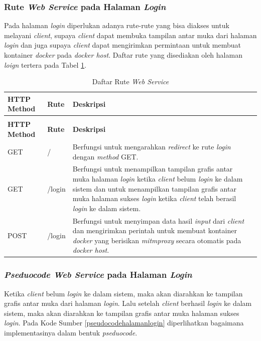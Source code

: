   \subsubsection{Rute \textit{Web Service} pada Halaman \textit{Login}}
  Pada halaman \textit{login} diperlukan adanya rute-rute yang bisa diakses untuk melayani \textit{client}, supaya \textit{client} dapat membuka tampilan antar muka dari halaman \textit{login} dan juga supaya \textit{client} dapat mengirimkan permintaan untuk membuat kontainer \textit{docker} pada \textit{docker host}. Daftar rute yang disediakan oleh halaman \textit{loign} tertera pada Tabel \ref{tabelRuteWebServiceHalamnLogin}.\\
  \begin{longtable}{|p{}|p{}|p{}|p{}|} %
  	
  	\caption{Daftar Rute \textit{Web Service}} \label{tabelRuteWebServiceHalamnLogin} \\
  	\hline
  	\textbf{HTTP Method} & \textbf{Rute} & \textbf{Deskripsi} \\ \hline
  	
  	\endfirsthead
  	\caption[]{Daftar Rute \textit{Web Service}}  \\
  	\hline
  	\textbf{HTTP Method} & \textbf{Rute} & \textbf{Deskripsi}  \\ \hline
  	
  	\endhead
  	\endfoot
  	\endlastfoot
  	
  	GET & / & Berfungsi untuk mengarahkan \textit{redirect} ke rute \textit{login} dengan \textit{method} GET.\\ \hline
  	GET & /login & Berfungsi untuk menampilkan tampilan grafis antar muka halaman \textit{login} ketika \textit{client} belum \textit{login} ke dalam sistem dan untuk menampilkan tampilan grafis antar muka halaman sukses \textit{login} ketika \textit{client} telah berasil \textit{login} ke dalam sistem.\\ \hline
  	POST & /login & Berfungsi untuk menyimpan data hasil \textit{input} dari \textit{client} dan mengirimkan perintah untuk membuat kontainer \textit{docker} yang berisikan \textit{mitmproxy} secara otomatis pada \textit{docker host}.\\ \hline
  \end{longtable}
  
  \subsubsection{\textit{Pseduocode Web Service} pada Halaman \textit{Login}}
  Ketika \textit{client} belum \textit{login} ke dalam sistem, maka akan diarahkan ke tampilan grafis antar muka dari halaman \textit{login}. Lalu setelah \textit{client} berhasil \textit{login} ke dalam sistem, maka akan diarahkan ke tampilan grafis antar muka halaman sukses \textit{login}. Pada Kode Sumber \ref{pseudocodehalamanlogin} diperlihatkan bagaimana implementasinya dalam bentuk \textit{pseduocode}.
  
